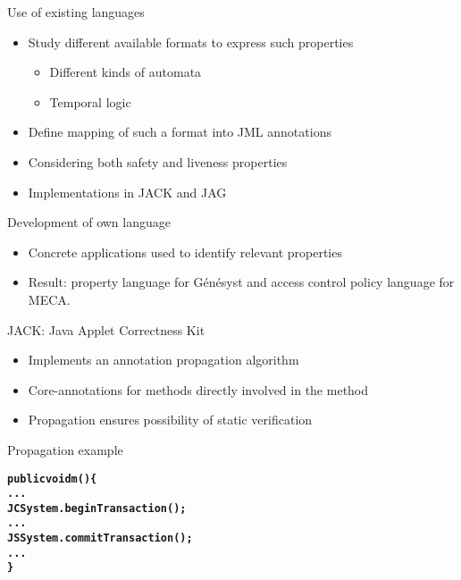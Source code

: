 \documentclass[final,nocolorBG,a4,marieke,nototal,ps, accumulate,slideColor]{prosper}
\begin{document}
\begin{slide}{Use of existing languages}
\begin{itemize}
\item Study different available formats to express such properties
\begin{itemize}
\item Different kinds of automata
\item Temporal logic
\end{itemize}
\item Define mapping of such a format into JML annotations
\item Considering both safety and liveness properties
\item Implementations in JACK and JAG
\end{itemize}
\end{slide}

\begin{slide}{Development of own language}
\begin{itemize}
\item Concrete applications used to identify relevant properties
\item Result: property language for G\'en\'esyst and access control
policy language for MECA.  
\end{itemize}
\end{slide}

\begin{slide}{JACK: Java Applet Correctness Kit}
\begin{itemize}
\item Implements an annotation propagation algorithm
\item Core-annotations for methods directly involved in the method
\item Propagation ensures possibility of static verification
\end{itemize}
\end{slide}

\begin{slide}{Propagation example}
\begin{alltt}
\textbf{public void m() \{
   ...
   JCSystem.beginTransaction();
   ...
   JSSystem.commitTransaction();
   ...
   \}}
\end{alltt}
\end{slide}
\end{document}
